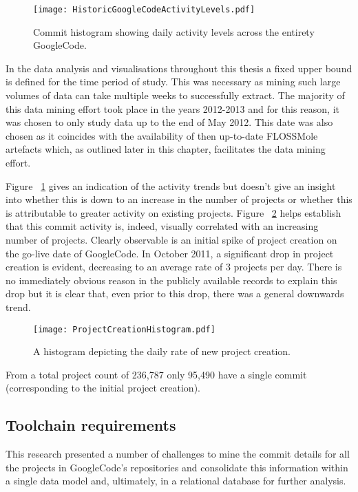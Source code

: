 \begin{figure}[htbp!] 
\centering    
\texttt{[image: HistoricGoogleCodeActivityLevels.pdf]}
\caption{Commit histogram showing daily activity levels across the entirety GoogleCode.}
\label{fig:HistoricGoogleCodeActivityLevels}
\end{figure}

In the data analysis and visualisations throughout this thesis a fixed upper bound is defined for the time period of study. This was necessary as mining such large volumes of data can take multiple weeks to successfully extract. The majority of this data mining effort took place in the years 2012-2013 and for this reason, it was chosen to only study data up to the end of May 2012. This date was also chosen as it coincides with the availability of then up-to-date FLOSSMole artefacts which, as outlined later in this chapter, facilitates the data mining effort.  

Figure ~\ref{fig:HistoricGoogleCodeActivityLevels} gives an indication of the activity trends but doesn't give an insight into whether this is down to an increase in the number of projects or whether this is attributable to greater activity on existing projects. Figure ~\ref{fig:ProjectCreationHistogram} helps establish that this commit activity is, indeed, visually correlated with an increasing number of projects. Clearly observable is an initial spike of project creation on the go-live date of GoogleCode. In October 2011, a significant drop in project creation is evident, decreasing to an average rate of 3 projects per day. There is no immediately obvious reason in the publicly available records to explain this drop but it is clear that, even prior to this drop, there was a general downwards trend.

\begin{figure}[htbp!] 
\centering    
\texttt{[image: ProjectCreationHistogram.pdf]}
\caption{A histogram depicting the daily rate of new project creation.}
\label{fig:ProjectCreationHistogram}
\end{figure}
	
From a total project count of 236,787 only 95,490 have a single commit (corresponding to the initial project creation). 			

\subsection{Toolchain requirements}
This research presented a number of challenges to mine the commit details for all the projects in GoogleCode's repositories and consolidate this information within a single data model and, ultimately, in a relational database for further analysis. 

